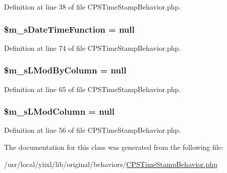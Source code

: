 Definition at line 38 of file CPSTimeStampBehavior.php.

\hypertarget{classCPSTimeStampBehavior_a36fc4c35bb816130af2c51aa1bf23cf2}{
\subsubsection[{\$m\_\-sDateTimeFunction}]{\setlength{\rightskip}{0pt plus 5cm}\$m\_\-sDateTimeFunction = null}}
\label{classCPSTimeStampBehavior_a36fc4c35bb816130af2c51aa1bf23cf2}


Definition at line 74 of file CPSTimeStampBehavior.php.

\hypertarget{classCPSTimeStampBehavior_ab00e4dbf2eb5aad2fa70ff6d024eb310}{
\subsubsection[{\$m\_\-sLModByColumn}]{\setlength{\rightskip}{0pt plus 5cm}\$m\_\-sLModByColumn = null}}
\label{classCPSTimeStampBehavior_ab00e4dbf2eb5aad2fa70ff6d024eb310}


Definition at line 65 of file CPSTimeStampBehavior.php.

\hypertarget{classCPSTimeStampBehavior_a2b569f58b9a9d36d7740ef74e38965d8}{
\subsubsection[{\$m\_\-sLModColumn}]{\setlength{\rightskip}{0pt plus 5cm}\$m\_\-sLModColumn = null}}
\label{classCPSTimeStampBehavior_a2b569f58b9a9d36d7740ef74e38965d8}


Definition at line 56 of file CPSTimeStampBehavior.php.



The documentation for this class was generated from the following file:\begin{DoxyCompactItemize}
\item 
/usr/local/yiixl/lib/original/behaviors/\hyperlink{CPSTimeStampBehavior_8php}{CPSTimeStampBehavior.php}\end{DoxyCompactItemize}

